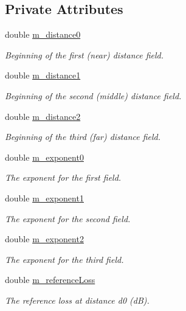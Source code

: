 \subsection*{Private Attributes}
\begin{DoxyCompactItemize}
\item 
double \hyperlink{classns3_1_1ThreeLogDistancePropagationLossModel_a47d290dc3c7638585677fc3611155997}{m\+\_\+distance0}
\begin{DoxyCompactList}\small\item\em Beginning of the first (near) distance field. \end{DoxyCompactList}\item 
double \hyperlink{classns3_1_1ThreeLogDistancePropagationLossModel_a7d3860fbf9e870e531347f5dbde5e586}{m\+\_\+distance1}
\begin{DoxyCompactList}\small\item\em Beginning of the second (middle) distance field. \end{DoxyCompactList}\item 
double \hyperlink{classns3_1_1ThreeLogDistancePropagationLossModel_a499aeeef32ff37d5f64f774abaf6e2a9}{m\+\_\+distance2}
\begin{DoxyCompactList}\small\item\em Beginning of the third (far) distance field. \end{DoxyCompactList}\item 
double \hyperlink{classns3_1_1ThreeLogDistancePropagationLossModel_a938d5a86f74faae0e032676e4a8a3233}{m\+\_\+exponent0}
\begin{DoxyCompactList}\small\item\em The exponent for the first field. \end{DoxyCompactList}\item 
double \hyperlink{classns3_1_1ThreeLogDistancePropagationLossModel_abc938d2139b48005f9c351a0f8abf1e2}{m\+\_\+exponent1}
\begin{DoxyCompactList}\small\item\em The exponent for the second field. \end{DoxyCompactList}\item 
double \hyperlink{classns3_1_1ThreeLogDistancePropagationLossModel_a709711d469a1d3ce799a73b403f40868}{m\+\_\+exponent2}
\begin{DoxyCompactList}\small\item\em The exponent for the third field. \end{DoxyCompactList}\item 
double \hyperlink{classns3_1_1ThreeLogDistancePropagationLossModel_a0d010a84de61ec8bb123467b6cae6ffb}{m\+\_\+reference\+Loss}
\begin{DoxyCompactList}\small\item\em The reference loss at distance d0 (dB). \end{DoxyCompactList}\end{DoxyCompactItemize}
